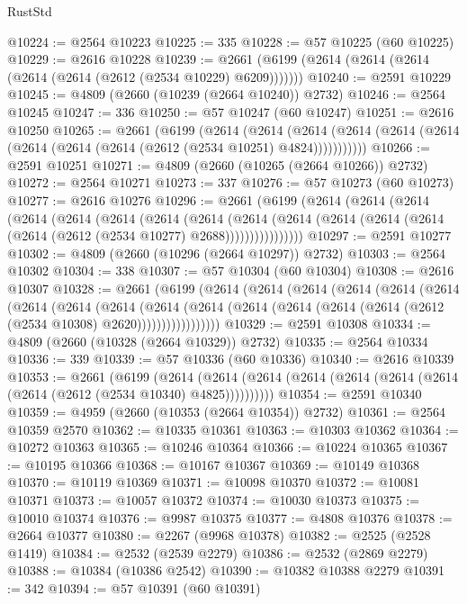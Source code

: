\begin{lexlean}{RustStd}
\begin{coremodule}
@10224 := @2564 @10223
@10225 := 335
@10228 := @57 @10225 (@60 @10225)
@10229 := @2616 @10228
@10239 := @2661 (@6199 (@2614 (@2614 (@2614 (@2614 (@2614 (@2612 (@2534 @10229) @6209)))))))
@10240 := @2591 @10229
@10245 := @4809 (@2660 (@10239 (@2664 @10240)) @2732)
@10246 := @2564 @10245
@10247 := 336
@10250 := @57 @10247 (@60 @10247)
@10251 := @2616 @10250
@10265 := @2661
    (@6199
      (@2614
        (@2614
          (@2614 (@2614 (@2614 (@2614 (@2614 (@2614 (@2614 (@2612 (@2534 @10251) @4824)))))))))))
@10266 := @2591 @10251
@10271 := @4809 (@2660 (@10265 (@2664 @10266)) @2732)
@10272 := @2564 @10271
@10273 := 337
@10276 := @57 @10273 (@60 @10273)
@10277 := @2616 @10276
@10296 := @2661
    (@6199
      (@2614
        (@2614
          (@2614
            (@2614
              (@2614
                (@2614
                  (@2614
                    (@2614
                      (@2614
                        (@2614
                          (@2614 (@2614 (@2614 (@2614 (@2612 (@2534 @10277) @2688))))))))))))))))
@10297 := @2591 @10277
@10302 := @4809 (@2660 (@10296 (@2664 @10297)) @2732)
@10303 := @2564 @10302
@10304 := 338
@10307 := @57 @10304 (@60 @10304)
@10308 := @2616 @10307
@10328 := @2661
    (@6199
      (@2614
        (@2614
          (@2614
            (@2614
              (@2614
                (@2614
                  (@2614
                    (@2614
                      (@2614
                        (@2614
                          (@2614
                            (@2614 (@2614 (@2614 (@2614 (@2612 (@2534 @10308) @2620)))))))))))))))))
@10329 := @2591 @10308
@10334 := @4809 (@2660 (@10328 (@2664 @10329)) @2732)
@10335 := @2564 @10334
@10336 := 339
@10339 := @57 @10336 (@60 @10336)
@10340 := @2616 @10339
@10353 := @2661
    (@6199
      (@2614 (@2614 (@2614 (@2614 (@2614 (@2614 (@2614 (@2614 (@2612 (@2534 @10340) @4825))))))))))
@10354 := @2591 @10340
@10359 := @4959 (@2660 (@10353 (@2664 @10354)) @2732)
@10361 := @2564 @10359 @2570
@10362 := @10335 @10361
@10363 := @10303 @10362
@10364 := @10272 @10363
@10365 := @10246 @10364
@10366 := @10224 @10365
@10367 := @10195 @10366
@10368 := @10167 @10367
@10369 := @10149 @10368
@10370 := @10119 @10369
@10371 := @10098 @10370
@10372 := @10081 @10371
@10373 := @10057 @10372
@10374 := @10030 @10373
@10375 := @10010 @10374
@10376 := @9987 @10375
@10377 := @4808 @10376
@10378 := @2664 @10377
@10380 := @2267 (@9968 @10378)
@10382 := @2525 (@2528 @1419)
@10384 := @2532 (@2539 @2279)
@10386 := @2532 (@2869 @2279)
@10388 := @10384 (@10386 @2542)
@10390 := @10382 @10388 @2279
@10391 := 342
@10394 := @57 @10391 (@60 @10391)

\end{coremodule}
\end{lexlean}
